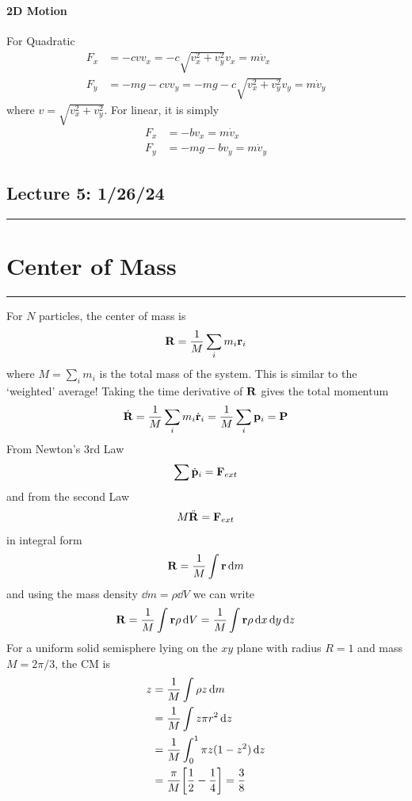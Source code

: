 \documentclass[../main.tex]{subfiles}
\begin{document}
\paragraph{2D Motion} For Quadratic
\begin{align*}
    F_x &= -c v v_x = -c \sqrt{v_x^2 + v_y^2} v_x  = m\dot v_x \\
    F_y &= -mg - c v v_y = -mg - c \sqrt{v_x^2 + v_y^2} v_y = m \dot v_y
\end{align*}
where $v = \sqrt{v_x^2 + v_y^2}$. For linear, it is simply
\begin{align*}
    F_x &= -bv_x = m\dot v_x \\
    F_y &= -mg - bv_y = m\dot v_y
\end{align*}

\pagebreak
\subsection*{Lecture 5: \hfill  1/26/24}
\hrule \vspace{10px}
\section{Center of Mass}
\hrule \vspace{10px}

For $N$ particles, the center of mass is
\begin{align*}
    \vb{R} = \frac{1}{M} \sum_i m_i \vb{r}_i
\end{align*}
where $M = \sum_i m_i$ is the total mass of the system. This is similar to the `weighted' average!
Taking the time derivative of $\vb{R}$ gives the total momentum
\begin{align*}
    \dot{\vb{R}} = \frac{1}{M} \sum_i m_i \dot{\vb{r}}_i = \frac{1}{M} \sum_i \vb{p}_i = \vb{P}
\end{align*}
From Newton's 3rd Law
\begin{align*}
    \sum \dot{\vb{p}}_i = \vb{F}_{ext}
\end{align*}
and from the second Law
\begin{align*}
    M \ddot{\vb{R}} = \vb{F}_{ext}
\end{align*}
in integral form 
\begin{align*}
    \vb{R} = \frac{1}{M} \int \vb{r} \dd{m}
\end{align*}
and using the mass density $\dd{m} = \rho \dd{V}$ we can write
\begin{align*}
    \vb{R} = \frac{1}{M} \int \vb{r} \rho \dd{V} = \frac{1}{M} \int \vb{r} \rho \dd{x} \dd{y} \dd{z}
\end{align*}
For a uniform solid semisphere lying on the $xy$ plane with radius $R=1$ and mass $M = 2\pi/3$, the
CM is 
\begin{align*}
    z &= \frac{1}{M} \int \rho z \dd{m} \\
    &= \frac{1}{M} \int z\pi r^2 \dd{z} \\
    &= \frac{1}{M} \int_0^1 \pi z (1 - z^2) \dd{z} \\
    &= \frac{\pi}{M} \qt[\frac{1}{2} - \frac{1}{4}] = \frac{3}{8}
\end{align*}
\end{document}
